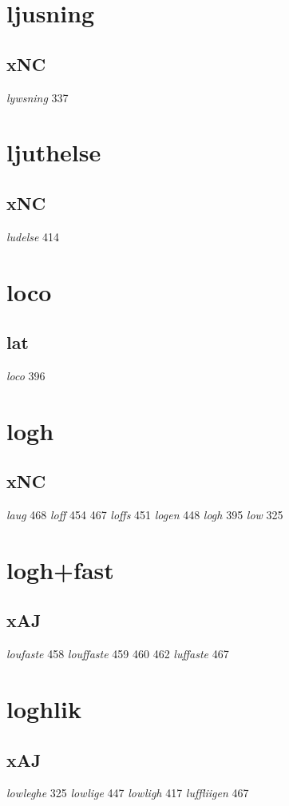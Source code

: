 \documentclass[a4paper,twocolumn]{article}
\begin{document}
\section{ljusning}
\label{sec:org651c456}
\subsection{xNC}
\label{sec:orga5a1bff}
\emph{lywsning} 337 
\section{ljuthelse}
\label{sec:org36730f7}
\subsection{xNC}
\label{sec:org5d859cd}
\emph{ludelse} 414 
\section{loco}
\label{sec:org64dece6}
\subsection{lat}
\label{sec:org219b340}
\emph{loco} 396 
\section{logh}
\label{sec:org24cc39a}
\subsection{xNC}
\label{sec:orgb175bb0}
\emph{laug} 468 \emph{loff} 454 467 \emph{loffs} 451 \emph{logen} 448 \emph{logh} 395 \emph{low} 325 
\section{logh+fast}
\label{sec:org7dcf698}
\subsection{xAJ}
\label{sec:org3f058ed}
\emph{loufaste} 458 \emph{louffaste} 459 460 462 \emph{luffaste} 467 
\section{loghlik}
\label{sec:org34680c3}
\subsection{xAJ}
\label{sec:org117805e}
\emph{lowleghe} 325 \emph{lowlige} 447 \emph{lowligh} 417 \emph{luffliigen} 467 
\end{document}
